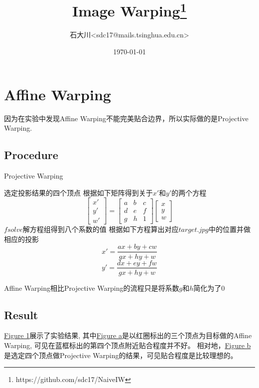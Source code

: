 \documentclass[UTF8]{ctexart}
\title{Image Warping\footnote{https://github.com/sdc17/NaiveIW}}
\author{石大川\quad <sdc17@mails.tsinghua.edu.cn>}
\date{\today}
\begin{document}
	\maketitle
	\section*{Affine Warping}
	因为在实验中发现Affine Warping不能完美贴合边界，所以实际做的是Projective Warping.
	\subsection*{Procedure}
	\begin{algorithm}[h]
		\caption{Projective Warping}
		\begin{algorithmic}[1]
			\State 选定投影结果的四个顶点
			\State 根据如下矩阵得到关于$x'$和$y'$的两个方程
			\begin{equation*}
				\begin{bmatrix} x' \\ y' \\ w'\end{bmatrix} = 
				\begin{bmatrix} a&b&c \\ d&e&f \\ g&h&1 \end{bmatrix}
				\begin{bmatrix} x \\ y \\ w \end{bmatrix}
			\end{equation*}	
			\EndFor
			\State $fsolve$解方程组得到八个系数的值
			\State 根据如下方程算出对应$target.jpg$中的位置并做相应的投影
			\begin{equation*}
				x'= \frac{ax+by+cw}{gx+hy+w} 
			\end{equation*}
			\begin{equation*}
				y' = \frac{dx+ey+fw}{gx+hy+w}
			\end{equation*}
			\EndFor
		\end{algorithmic}
	\end{algorithm}
	Affine Warping相比Projective Warping的流程只是将系数$g$和$h$简化为了$0$
	\subsection*{Result}
	
	\hyperref[Fig.projective]{Figure 1}展示了实验结果, 其中\hyperref[Fig.sub.1]{Figure a}是以红圈标出的三个顶点为目标做的Affine Warping, 可见在蓝框标出的第四个顶点附近贴合程度并不好。 相对地，\hyperref[Fig.sub.2]{Figure b}是选定四个顶点做Projective Warping的结果，可见贴合程度是比较理想的。
	
\end{document}
